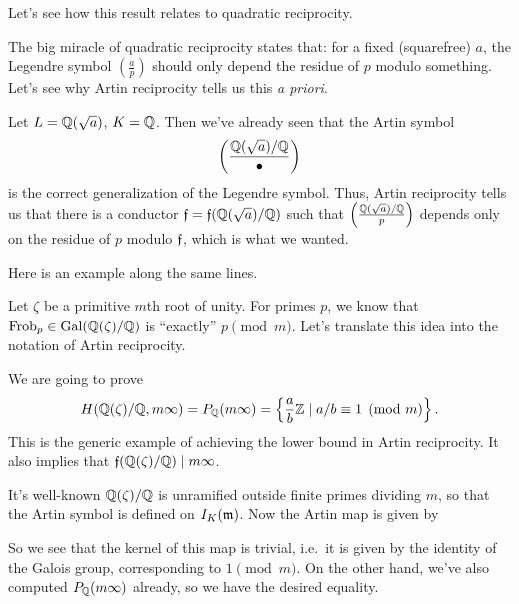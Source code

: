 Let's see how this result relates to quadratic reciprocity.
\begin{example}
	The big miracle of quadratic reciprocity states that:
	for a fixed (squarefree) $a$,
	the Legendre symbol $\left( \frac ap \right)$
	should only depend the residue of $p$ modulo something.
	Let's see why Artin reciprocity tells us this \emph{a priori}.

	Let $L = \mathbb Q(\sqrt a)$, $K = \mathbb Q$.
	Then we've already seen that the Artin symbol
	\[ \left( \frac{\mathbb Q(\sqrt a)/\mathbb Q}{\bullet} \right) \]
	is the correct generalization of the Legendre symbol.
	Thus, Artin reciprocity tells us that there is a conductor
	$\mathfrak f = \mathfrak f(\mathbb Q(\sqrt a)/\mathbb Q)$ such that
	$\left( \frac{\mathbb Q(\sqrt a)/\mathbb Q}{p} \right)$ depends only on
	the residue of $p$ modulo $\mathfrak f$, which is what we wanted.
\end{example}

Here is an example along the same lines.
\begin{example}
	Let $\zeta$ be a primitive $m$th root of unity.
	For primes $p$, we know that $\mathrm{Frob}_p \in \operatorname{Gal}(\mathbb Q(\zeta)/\mathbb Q)$
	is ``exactly'' $p \pmod m$.
	Let's translate this idea into the notation of Artin reciprocity.

	We are going to prove
	\[
		H(\mathbb Q(\zeta) / \mathbb Q,  m\infty)
		= P_\mathbb Q(m\infty)
		= \left\{ \frac ab \mathbb Z \mid a/b \equiv 1 \pmod m \right\}.
	\]
	This is the generic example of achieving the lower bound in Artin reciprocity.
	It also implies that $\mathfrak f(\mathbb Q(\zeta)/\mathbb Q) \mid m\infty$.

	It's well-known $\mathbb Q(\zeta)/\mathbb Q$ is unramified outside finite primes dividing $m$,
	so that the Artin symbol is defined on $I_K(\mathfrak m)$.
	Now the Artin map is given by
	\begin{center}
	\end{center}
	So we see that the kernel of this map is trivial,
	i.e.\ it is given by the identity of the Galois group,
	corresponding to $1 \pmod m$.
	On the other hand, we've also computed $P_\mathbb Q(m\infty)$ already,
	so we have the desired equality.
\end{example}

